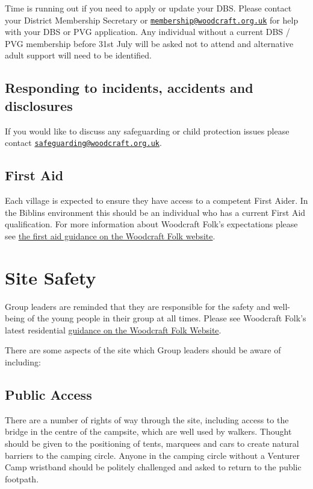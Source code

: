 \documentclass[a4paper, 11pt]{report}
\newcommand{\nl}{\newline}
\begin{document}
Time is running out if you need to apply or update your DBS. Please contact your District Membership Secretary or \href{mailto:membership@woodcraft.org.uk}{\texttt{membership@woodcraft.org.uk}} for help with your DBS or PVG application. Any individual without a current DBS / PVG membership before 31st July will be asked not to attend and alternative adult support will need to be identified.

\section{Responding to incidents, accidents and disclosures}
If you would like to discuss any safeguarding or child protection issues please contact \href{mailto:safeguarding@woodcraft.org.uk}{\texttt{safeguarding@woodcraft.org.uk}}.

\section{First Aid}
Each village is expected to ensure they have access to a competent First Aider. In the Biblins environment this should be an individual who has a current First Aid qualification. For more information about Woodcraft Folk's expectations please see \href{https://woodcraft.org.uk/resources/first-aid-guidance/}{the first aid guidance on the Woodcraft Folk website}.

\chapter{Site Safety}
Group leaders are reminded that they are responsible for the safety and well-being of the young people in their group at all times. Please see Woodcraft Folk's latest residential \href{https://woodcraft.org.uk/group-guidance/camping-and-residentials/}{guidance on the Woodcraft Folk Website}. \nl

There are some aspects of the site which Group leaders should be aware of including:
\section{Public Access}
There are a number of rights of way through the site, including access to the bridge in the centre of the campsite, which are well used by walkers. Thought should be given to the positioning of tents, marquees and cars to create natural barriers to the camping circle. Anyone in the camping circle without a Venturer Camp wristband should be politely challenged and asked to return to the public footpath.
\end{document}
